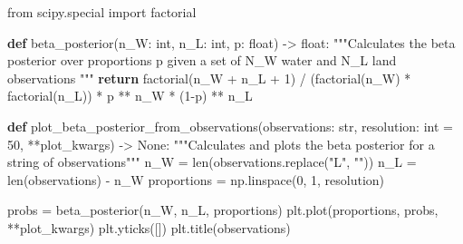 \documentclass[
  letterpaper,
  DIV=11,
  numbers=noendperiod]{scrreprt}
\newenvironment{Shaded}{\begin{snugshade}}{\end{snugshade}}
\newcommand{\BuiltInTok}[1]{\textcolor[rgb]{0.00,0.23,0.31}{#1}}
\newcommand{\CommentTok}[1]{\textcolor[rgb]{0.37,0.37,0.37}{#1}}
\newcommand{\ControlFlowTok}[1]{\textcolor[rgb]{0.00,0.23,0.31}{\textbf{#1}}}
\newcommand{\DecValTok}[1]{\textcolor[rgb]{0.68,0.00,0.00}{#1}}
\newcommand{\ImportTok}[1]{\textcolor[rgb]{0.00,0.46,0.62}{#1}}
\newcommand{\KeywordTok}[1]{\textcolor[rgb]{0.00,0.23,0.31}{\textbf{#1}}}
\newcommand{\NormalTok}[1]{\textcolor[rgb]{0.00,0.23,0.31}{#1}}
\newcommand{\OperatorTok}[1]{\textcolor[rgb]{0.37,0.37,0.37}{#1}}
\newcommand{\StringTok}[1]{\textcolor[rgb]{0.13,0.47,0.30}{#1}}
\newcommand{\VariableTok}[1]{\textcolor[rgb]{0.07,0.07,0.07}{#1}}
\begin{document}
\begin{Shaded}
\begin{Highlighting}[]
\ImportTok{from}\NormalTok{ scipy.special }\ImportTok{import}\NormalTok{ factorial}

\KeywordTok{def}\NormalTok{ beta\_posterior(n\_W: }\BuiltInTok{int}\NormalTok{, n\_L: }\BuiltInTok{int}\NormalTok{, p: }\BuiltInTok{float}\NormalTok{) }\OperatorTok{{-}\textgreater{}} \BuiltInTok{float}\NormalTok{:}
    \CommentTok{"""Calculates the beta posterior over proportions \textasciigrave{}p\textasciigrave{} given a set of}
\CommentTok{    \textasciigrave{}N\_W\textasciigrave{} water and \textasciigrave{}N\_L\textasciigrave{} land observations}
\CommentTok{    """}
    \ControlFlowTok{return}\NormalTok{ factorial(n\_W }\OperatorTok{+}\NormalTok{ n\_L }\OperatorTok{+} \DecValTok{1}\NormalTok{) }\OperatorTok{/}\NormalTok{ (factorial(n\_W) }\OperatorTok{*}\NormalTok{ factorial(n\_L)) }\OperatorTok{*}\NormalTok{ p }\OperatorTok{**}\NormalTok{ n\_W }\OperatorTok{*}\NormalTok{ (}\DecValTok{1}\OperatorTok{{-}}\NormalTok{p) }\OperatorTok{**}\NormalTok{ n\_L}


\KeywordTok{def}\NormalTok{ plot\_beta\_posterior\_from\_observations(observations: }\BuiltInTok{str}\NormalTok{, resolution: }\BuiltInTok{int} \OperatorTok{=} \DecValTok{50}\NormalTok{, }\OperatorTok{**}\NormalTok{plot\_kwargs) }\OperatorTok{{-}\textgreater{}} \VariableTok{None}\NormalTok{:}
    \CommentTok{"""Calculates and plots the beta posterior for a string of observations"""}
\NormalTok{    n\_W }\OperatorTok{=} \BuiltInTok{len}\NormalTok{(observations.replace(}\StringTok{"L"}\NormalTok{, }\StringTok{""}\NormalTok{))}
\NormalTok{    n\_L }\OperatorTok{=} \BuiltInTok{len}\NormalTok{(observations) }\OperatorTok{{-}}\NormalTok{ n\_W}
\NormalTok{    proportions }\OperatorTok{=}\NormalTok{ np.linspace(}\DecValTok{0}\NormalTok{, }\DecValTok{1}\NormalTok{, resolution)}
        
\NormalTok{    probs }\OperatorTok{=}\NormalTok{ beta\_posterior(n\_W, n\_L, proportions)}
\NormalTok{    plt.plot(proportions, probs, }\OperatorTok{**}\NormalTok{plot\_kwargs)}
\NormalTok{    plt.yticks([])}
\NormalTok{    plt.title(observations)}
    


\end{Highlighting}
\end{Shaded}
\end{document}

